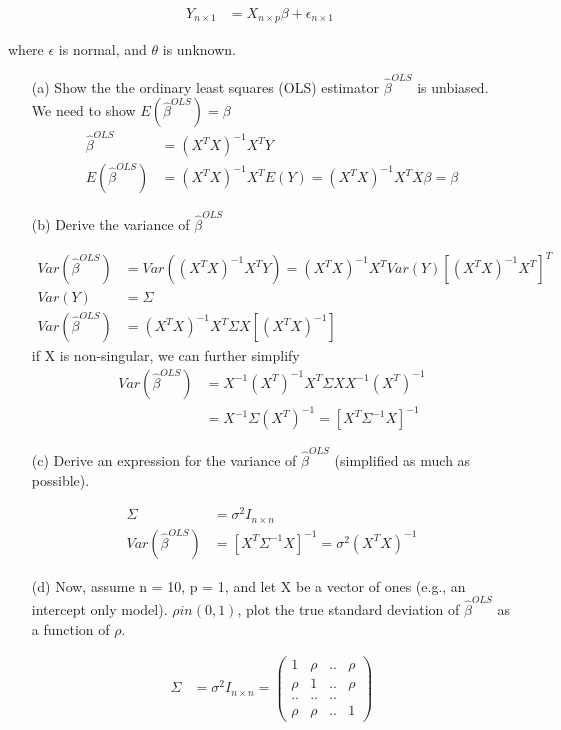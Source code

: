 \documentclass[11pt]{article} %
\begin{document}
\begin{align*}
	Y_{n \times 1} &= X_{n \times p} \beta + \epsilon_{n \times 1}
\end{align*}

where $\epsilon$ is normal, and $\theta$ is unknown.

\begin{itemize}
	\item [(a)] Show the the ordinary least squares (OLS) estimator $\hat{\beta}^{OLS}$ is unbiased.
	We need to show $E(\hat{\beta}^{OLS}) = \beta$
\begin{align*}
	\hat{\beta}^{OLS} &=  (X^T X)^{-1}X^T Y \\
	E(\hat{\beta}^{OLS}) &= (X^T X)^{-1}X^T E(Y) =  (X^T X)^{-1}X^T X \beta = \beta
\end{align*}	
	
	\item[(b)] Derive the variance of $\hat{\beta}^{OLS}$ 
	
\begin{align*}
	Var(\hat{\beta}^{OLS}) &= Var((X^T X)^{-1}X^T Y )= (X^T X)^{-1}X^T Var(Y) [(X^T X)^{-1}X^T ]^T \\
	Var(Y) &= \Sigma \\
	Var(\hat{\beta}^{OLS})  & =  (X^T X)^{-1}X^T \Sigma X [(X^T X)^{-1}] 
\end{align*}		
	if X is non-singular, we can further simplify 
\begin{align*}	
	Var(\hat{\beta}^{OLS})	&= X^{-1} (X^T)^{-1} X^T \Sigma X X^{-1} (X^T)^{-1} \\
	&= X^{-1} \Sigma (X^T)^{-1} = [X^T \Sigma^{-1} X]^{-1}
\end{align*}		
	
	\item[(c)] Derive an expression for the variance of $\hat{\beta}^{OLS}$ (simplified as much as possible).
	
	\begin{align*}
	\Sigma &= \sigma^2 I_{n \times n} \\
	Var(\hat{\beta}^{OLS}) &= [X^T \Sigma^{-1} X]^{-1} = \sigma^2 (X^T X)^{-1}
\end{align*}

\item[(d)] Now, assume n = 10, p = 1, and let X be a vector of ones (e.g., an intercept only model). $\rho in (0,1)$, plot the true standard deviation of $\hat{\beta}^{OLS}$ as a function of $\rho$.

\begin{align*}
	\Sigma &= \sigma^2 I_{n \times n} = \begin{pmatrix}
	1 & \rho &.. & \rho \\
	\rho & 1 &.. & \rho\\
	.. &.. & ..& \\
	\rho & \rho &. .& 1  
	\end{pmatrix}
\end{align*}


\end{itemize}
\end{document}
